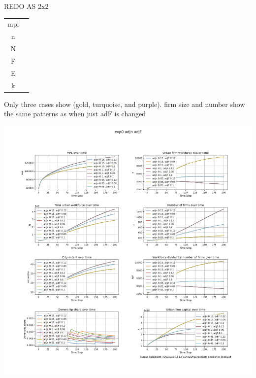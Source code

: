 \documentclass{article}
\begin{document}
 REDO AS 2x2
\begin{multicols}{2}
\begin{tabular}{c|c}
  mpl  &  \\
  n   &  \\
  N   &  \\
  F   &  \\
  E   &  \\
  k   & 
\end{tabular} 
Only three cases show (gold, turquoise, and purple). firm size and number show the same patterns as when just adF is changed 
\end{multicols}

\includegraphics[scale=.55]{fig/Analysis/F-n-adjustment-speed.png}

\end{document}
